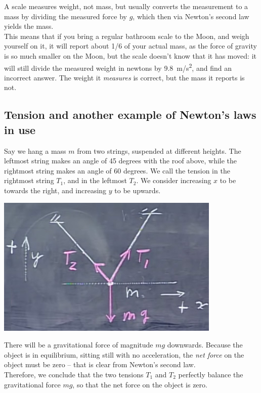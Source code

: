 \documentclass[12pt,a4paper]{report}
\begin{document}
A scale measures weight, not mass, but usually converts the measurement to a mass by dividing the measured force by $g$, which then via Newton's second law yields the mass.\\
This means that if you bring a regular bathroom scale to the Moon, and weigh yourself on it, it will report about 1/6 of your actual mass, as the force of gravity is so much smaller on the Moon, but the scale doesn't know that it has moved: it will still divide the measured weight in newtons by \SI{9.8}{m/s^2}, and find an incorrect answer. The weight it \emph{measures} is correct, but the mass it reports is not.

\subsection{Tension and another example of Newton's laws in use}

Say we hang a mass $m$ from two strings, suspended at different heights. The leftmost string makes an angle of 45 degrees with the roof above, while the rightmost string makes an angle of 60 degrees. We call the tension in the rightmost string $T_1$, and in the leftmost $T_2$. We consider increasing $x$ to be towards the right, and increasing $y$ to be upwards.

\begin{center}
\includegraphics[scale=0.6]{Graphics/lec6_tension}
\end{center}

There will be a gravitational force of magnitude $m g$ downwards. Because the object is in equilibrium, sitting still with no acceleration, the \emph{net force} on the object must be zero -- that is clear from Newton's second law.\\
Therefore, we conclude that the two tensions $T_1$ and $T_2$ perfectly balance the gravitational force $m g$, so that the net force on the object is zero.
\end{document}
